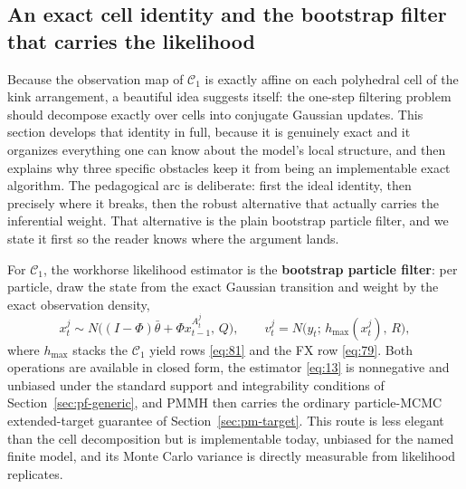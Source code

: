 \documentclass[11pt]{article}
\begin{document}
\subsection{An exact cell identity and the bootstrap filter that carries
the likelihood}
\label{sec:shadow-filter}

Because the observation map of \(\mathcal C_1\) is exactly affine on each
polyhedral cell of the kink arrangement, a beautiful idea suggests itself:
the one-step filtering problem should decompose exactly over cells into
conjugate Gaussian updates. This
section develops that identity in full, because it is genuinely exact and
it organizes everything one can know about the model's local structure,
and then explains why three specific obstacles keep it from being
an implementable exact algorithm. The pedagogical arc is deliberate:
first the ideal identity, then precisely where it breaks, then the
robust alternative that actually carries the inferential weight. That
alternative is the plain bootstrap particle filter, and we state it
first so the reader knows where the argument lands.

For \(\mathcal C_1\), the workhorse likelihood estimator is the
\textbf{bootstrap particle filter}: per particle, draw the state from
the exact Gaussian transition and weight by the exact observation
density,
\begin{equation}\label{eq:82a}
 x_t^j\sim N\bigl((I-\Phi)\bar\theta+\Phi x_{t-1}^{A_t^j},\,Q\bigr),
 \qquad
 v_t^j=N\bigl(y_t;\,h_{\max}(x_t^j),\,R\bigr),
\end{equation}
where \(h_{\max}\) stacks the \(\mathcal C_1\) yield rows
\eqref{eq:81} and the FX row \eqref{eq:79}. Both operations are
available in closed form, the estimator \eqref{eq:13} is nonnegative
and unbiased under the standard support and integrability conditions
of Section~\ref{sec:pf-generic}, and PMMH then carries the ordinary
particle-MCMC extended-target guarantee of Section~\ref{sec:pm-target}. This
route is less elegant than the cell decomposition but is implementable
today, unbiased for the named finite model, and its Monte Carlo variance is
directly measurable from likelihood replicates.
\end{document}
